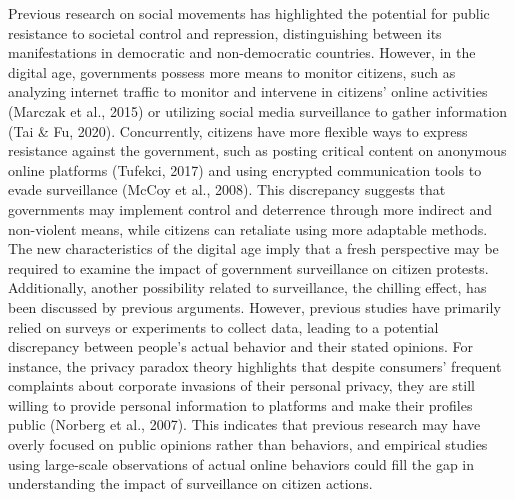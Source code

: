 \documentclass[12pt]{article}
\begin{document}
Previous research on social movements has highlighted the potential for public resistance to societal control and repression, distinguishing between its manifestations in democratic and non-democratic countries. However, in the digital age, governments possess more means to monitor citizens, such as analyzing internet traffic to monitor and intervene in citizens' online activities (Marczak et al., 2015) or utilizing social media surveillance to gather information (Tai \& Fu, 2020). Concurrently, citizens have more flexible ways to express resistance against the government, such as posting critical content on anonymous online platforms (Tufekci, 2017) and using encrypted communication tools to evade surveillance (McCoy et al., 2008). This discrepancy suggests that governments may implement control and deterrence through more indirect and non-violent means, while citizens can retaliate using more adaptable methods. The new characteristics of the digital age imply that a fresh perspective may be required to examine the impact of government surveillance on citizen protests. Additionally, another possibility related to surveillance, the chilling effect, has been discussed by previous arguments. However, previous studies have primarily relied on surveys or experiments to collect data, leading to a potential discrepancy between people's actual behavior and their stated opinions. For instance, the privacy paradox theory highlights that despite consumers' frequent complaints about corporate invasions of their personal privacy, they are still willing to provide personal information to platforms and make their profiles public (Norberg et al., 2007). This indicates that previous research may have overly focused on public opinions rather than behaviors, and empirical studies using large-scale observations of actual online behaviors could fill the gap in understanding the impact of surveillance on citizen actions.
\end{document}
